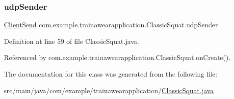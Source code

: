 \subsubsection{\texorpdfstring{udpSender}{udpSender}}
{\footnotesize\ttfamily \mbox{\hyperlink{classcom_1_1example_1_1trainawearapplication_1_1_client_send}{Client\+Send}} com.\+example.\+trainawearapplication.\+Classic\+Squat.\+udp\+Sender\hspace{0.3cm}{\ttfamily [private]}}



Definition at line 59 of file Classic\+Squat.\+java.



Referenced by com.\+example.\+trainawearapplication.\+Classic\+Squat.\+on\+Create().



The documentation for this class was generated from the following file\+:\begin{DoxyCompactItemize}
\item 
src/main/java/com/example/trainawearapplication/\mbox{\hyperlink{_classic_squat_8java}{Classic\+Squat.\+java}}\end{DoxyCompactItemize}
